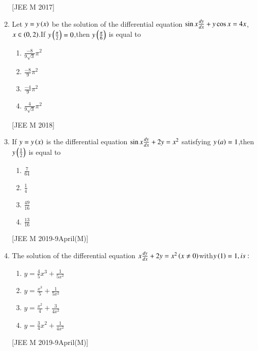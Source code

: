 \documentclass[journal]{IEEEtran}
\begin{document}
\begin{enumerate}
\begin{multicols}{2}
\begin{enumerate}
 \end{enumerate}
\end{multicols}
\hfill
{[JEE M 2017]}


\item Let $ y=y\left(x\right)$ be the solution of the differential equation $\sin{x}\frac{d{y}}{d{x}}+y\cos{x}=4x$,$x\in\left(0,2\right)$.If $y\left(\frac{\pi}{2}\right)=0$,then $y\left(\frac{\pi}{6}\right)$ is equal to
\begin{multicols}{2}
 \begin{enumerate}
    \item $ \frac{-8}{9\sqrt{3}}\pi^2$
    \item $ \frac{-8}{9}\pi^2$
    \item $\frac{-4}{9}\pi^2$
    \item $ \frac{4}{9\sqrt{3}}\pi^2 $
 \end{enumerate}
\end{multicols}
\hfill
{[JEE M 2018]}
\item If $ y=y\left(x\right)$ is the differential equation $ \sin{x}\frac{d{y}}{d{x}}+2y=x^2$ satisfying $y\left(a\right)=1$,then $y\left(\frac{1}{2}\right)$ is equal to
\begin{multicols}{2}
 \begin{enumerate}
    \item $ \frac{7}{64}$

    
    \item $ \frac{1}{4}$

    
    \item $ \frac{49}{16}$
    
    \item $ \frac{13}{16}$
    
    
 \end{enumerate}
\end{multicols}
\hfill
{[JEE M 2019-9April(M)]}
\item The solution of the differential equation $ x\frac{d{y}}{d{x}}+2y=x^2 \left(x\neq0\right)$with$ y\left(1\right)=1,is:$
\begin{multicols}{2}
 \begin{enumerate}
    \item $ y=\frac{4}{5}x^3+\frac{1}{5x^2}$

    \item $ y=\frac{x^3}{5}+\frac{1}{5x^2}$
    \item $ y=\frac{x^2}{4}+\frac{3}{4x^2}$
    \item $ y=\frac{3}{4}x^2+\frac{1}{4x^2}$
  \end{enumerate}
\end{multicols}
\hfill
{[JEE M 2019-9April(M)]}















\end{enumerate}
\end{document}
